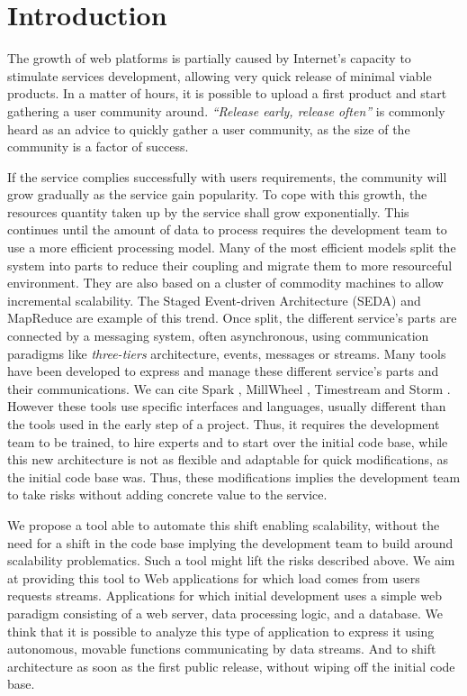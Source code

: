 \section{Introduction}


The growth of web platforms is partially caused by Internet's capacity to stimulate services development, allowing very quick release of minimal viable products.
In a matter of hours, it is possible to upload a first product and start gathering a user community around.
\textit{``Release early, release often''} is commonly heard as an advice to quickly gather a user community, as the size of the community is a factor of success.

If the service complies successfully with users requirements, the community will grow gradually as the service gain popularity.
To cope with this growth, the resources quantity taken up by the service shall grow exponentially.
This continues until the amount of data to process requires the development team to use a more efficient processing model.  %
Many of the most efficient models split the system into parts to reduce their coupling and migrate them to more resourceful environment.
They are also based on a cluster of commodity machines\cite{Fox1997} to allow incremental scalability.
The Staged Event-driven Architecture (SEDA)\cite{Welsh2000} and MapReduce \cite{Dean2008} are example of this trend.
Once split, the different service's parts are connected by a messaging system, often asynchronous, using communication paradigms like \textit{three-tiers} architecture, events, messages or streams.
Many tools have been developed to express and manage these different service's parts and their communications.
We can cite Spark \cite{Zaharia2010}, MillWheel \cite{Akidau2013}, Timestream \cite{Qian2013} and Storm \cite{Marz2011}.
However these tools use specific interfaces and languages, usually different than the tools used in the early step of a project.
Thus, it requires the development team to be trained, to hire experts and to start over the initial code base, while this new architecture is not as flexible and adaptable for quick modifications, as the initial code base was.
Thus, these modifications implies the development team to take risks without adding concrete value to the service.

We propose a tool able to automate this shift enabling scalability, without the need for a shift in the code base implying the development team to build around scalability problematics.
Such a tool might lift the risks described above.
We aim at providing this tool to Web applications for which load comes from users requests streams.
Applications for which initial development uses a simple web paradigm consisting of a web server, data processing logic, and a database.
We think that it is possible to analyze this type of application to express it using autonomous, movable functions communicating by data streams.
And to shift architecture as soon as the first public release, without wiping off the initial code base.

